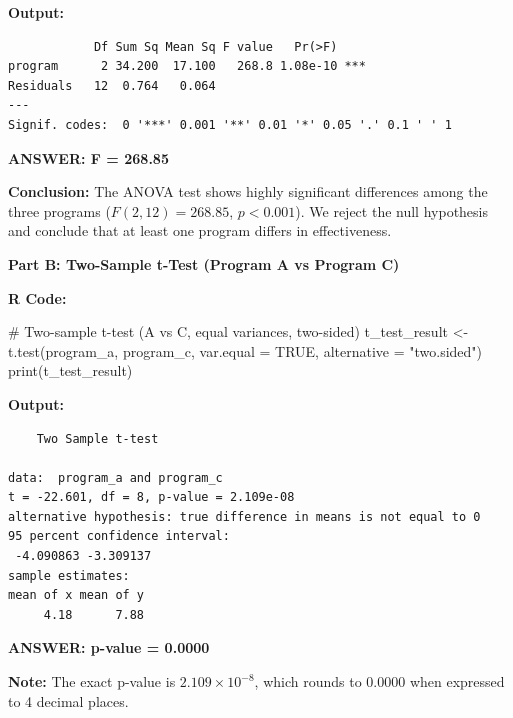 \documentclass[11pt]{article}
\begin{document}
\vspace{0.3cm}

\textbf{Output:}
\begin{verbatim}
            Df Sum Sq Mean Sq F value   Pr(>F)
program      2 34.200  17.100   268.8 1.08e-10 ***
Residuals   12  0.764   0.064
---
Signif. codes:  0 '***' 0.001 '**' 0.01 '*' 0.05 '.' 0.1 ' ' 1
\end{verbatim}

\vspace{0.3cm}

\textcolor{answergreen}{\textbf{ANSWER: F = 268.85}}

\vspace{0.3cm}

\textbf{Conclusion:} The ANOVA test shows highly significant differences among the three programs ($F(2,12) = 268.85$, $p < 0.001$). We reject the null hypothesis and conclude that at least one program differs in effectiveness.

\vspace{1cm}

\textbf{Part B: Two-Sample t-Test (Program A vs Program C)}

\vspace{0.3cm}

\textbf{R Code:}

\begin{rcode}
# Two-sample t-test (A vs C, equal variances, two-sided)
t_test_result <- t.test(program_a, program_c,
                        var.equal = TRUE,
                        alternative = "two.sided")
print(t_test_result)
\end{rcode}

\vspace{0.3cm}

\textbf{Output:}
\begin{verbatim}
	Two Sample t-test

data:  program_a and program_c
t = -22.601, df = 8, p-value = 2.109e-08
alternative hypothesis: true difference in means is not equal to 0
95 percent confidence interval:
 -4.090863 -3.309137
sample estimates:
mean of x mean of y
     4.18      7.88
\end{verbatim}

\vspace{0.3cm}

\textcolor{answergreen}{\textbf{ANSWER: p-value = 0.0000}}

\vspace{0.3cm}

\textbf{Note:} The exact p-value is $2.109 \times 10^{-8}$, which rounds to 0.0000 when expressed to 4 decimal places.
\end{document}
